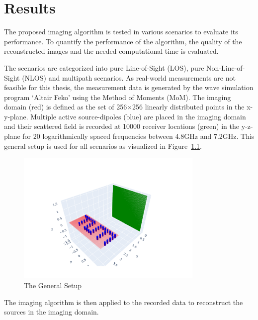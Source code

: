 
\chapter{Results}\label{chapter:results}
The proposed imaging algorithm is tested in various scenarios to evaluate its performance.
To quantify the performance of the algorithm, the quality of the reconstructed images and the needed computational time is evaluated.


The scenarios are categorized into pure Line-of-Sight (LOS), pure Non-Line-of-Sight (NLOS) and multipath scenarios.
As real-world measurements are not feasible for this thesis, the measurement data is generated by the wave simulation program `Altair Feko' using the Method of Moments (MoM).
The imaging domain (red) is defined as the set of 256\(\times \)256 linearly distributed points in the x-y-plane.
Multiple active source-dipoles (blue) are placed in the imaging domain and their scattered field is recorded at 10000 receiver locations (green) in the y-z-plane for 20 logarithmically spaced frequencies between 4.8GHz and 7.2GHz.
This general setup is used for all scenarios as visualized in Figure~\ref{fig:general_setup}.

\begin{figure}[ht]
    \centering
    \includegraphics[width=0.8\textwidth]{figures/general_setup.pdf}
    \caption{The General Setup}\label{fig:general_setup}
\end{figure}


The imaging algorithm is then applied to the recorded data to reconstruct the sources in the imaging domain.


